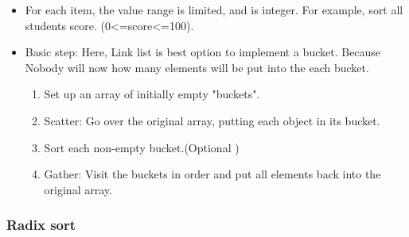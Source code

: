 \documentclass[a4paper,11pt,twoside]{book}
\begin{document}
\begin{itemize}
\item For each item, the value range is limited, and is integer. For example, sort all students score. (0<=score<=100). 

\item Basic step:  Here, Link list is best option to implement a bucket. Because Nobody will now how many elements will be put into the each bucket. 
\begin{enumerate}
\item Set up an array of initially empty "buckets".
\item Scatter: Go over the original array, putting each object in its bucket. 
\item Sort each non-empty bucket.(Optional )
\item Gather: Visit the buckets in order and put all elements back into the original array.
\end{enumerate}

\end{itemize}

\subsubsection{Radix sort}
\end{document}
